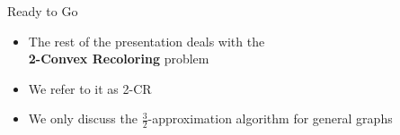 \begin{frame}{Ready to Go}
\begin{itemize}
	
\item
The rest of the presentation deals with the \\
\textbf{2-Convex Recoloring} problem

\pause\item
We refer to it as \alert{2-CR}

\pause\item
We only discuss the $\frac{3}{2}$-approximation algorithm for general graphs 

	
\end{itemize}
\end{frame}
